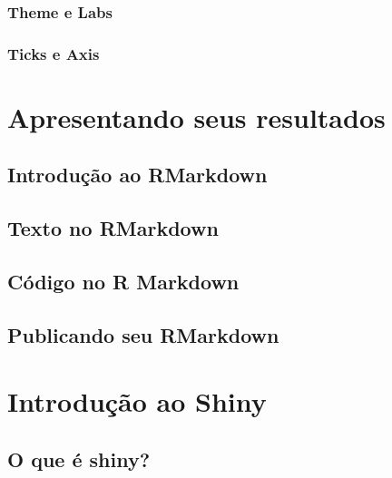 \documentclass[
]{book}
\begin{document}
\hypertarget{theme-e-labs}{%
\subsection{Theme e Labs}\label{theme-e-labs}}

\hypertarget{ticks-e-axis}{%
\subsection{Ticks e Axis}\label{ticks-e-axis}}

\hypertarget{resultados}{%
\chapter{Apresentando seus resultados}\label{resultados}}

\hypertarget{introduuxe7uxe3o-ao-rmarkdown}{%
\section{Introdução ao RMarkdown}\label{introduuxe7uxe3o-ao-rmarkdown}}

\hypertarget{texto-no-rmarkdown}{%
\section{Texto no RMarkdown}\label{texto-no-rmarkdown}}

\hypertarget{cuxf3digo-no-r-markdown}{%
\section{Código no R Markdown}\label{cuxf3digo-no-r-markdown}}

\hypertarget{publicando-seu-rmarkdown}{%
\section{Publicando seu RMarkdown}\label{publicando-seu-rmarkdown}}

\hypertarget{shiny1}{%
\chapter{Introdução ao Shiny}\label{shiny1}}

\hypertarget{o-que-uxe9-shiny}{%
\section{O que é shiny?}\label{o-que-uxe9-shiny}}
\end{document}
